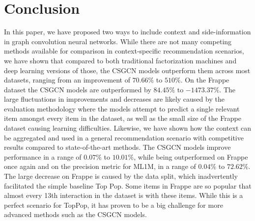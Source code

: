 \section{Conclusion}\label{sec:conclusion}
In this paper, we have proposed two ways to include context and side-information in graph convolution neural networks.
While there are not many competing methods available for comparison in context-specific recommendation scenarios, we have shown that compared to both traditional factorization machines and deep learning versions of those, the CSGCN models outperform them across most datasets, ranging from an improvement of $70.66\%$ to $510\%$.
On the Frappe dataset the CSGCN models are outperformed by $84.45\%$ to $-1473.37\%$.
The large fluctuations in improvements and decreases are likely caused by the evaluation methodology where the models attempt to predict a single relevant item amongst every item in the dataset, as well as the small size of the Frappe dataset causing learning difficulties.
Likewise, we have shown how the context can be aggregated and used in a general recommendation scenario with competitive results compared to state-of-the-art methods.
The CSGCN models improve performance in a range of $0.07\%$ to $10.01\%$, while being outperformed on Frappe once again and on the precision metric for ML1M, in a range of $0.04\%$ to $72.62\%$.
The large decrease on Frappe is caused by the data split, which inadvertently facilitated the simple baseline Top Pop.
Some items in Frappe are so popular that almost every 13th interaction in the dataset is with these items.
While this is a perfect scenario for TopPop, it has proven to be a big challenge for more advanced methods such as the CSGCN models.


